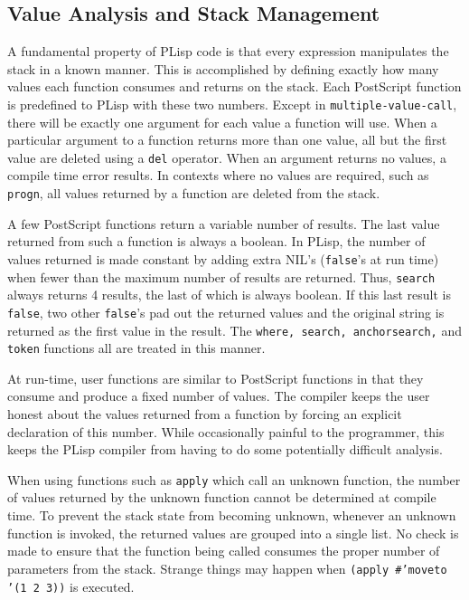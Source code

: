 \subsection {Value Analysis and Stack Management}
A fundamental property of PLisp code is that every expression
manipulates the stack in a known manner.  This is accomplished by
defining exactly how many values each function consumes and returns on
the stack.  Each PostScript function is predefined to PLisp with these
two numbers.  Except in {\tt multiple-value-call}, there will be
exactly one argument for each value a function will use.  When a
particular argument to a function returns more than one value, all but
the first value are deleted using a {\tt del} operator.  When an
argument returns no values, a compile time error results.  In contexts
where no values are required, such as {\tt progn}, all values returned
by a function are deleted from the stack.

A few PostScript functions return a variable number of results.
The last value returned from such a function is always a boolean.  In
PLisp, the number of values returned is made constant by adding extra
NIL's ({\tt false}'s at run time) when fewer than the maximum number
of results are returned.  Thus, {\tt search} always returns 4 results,
the last of which is always boolean.  If this last result is {\tt
false}, two other {\tt false}'s pad out the returned values and the
original string is returned as the first value in the result.
The {\tt where, search, anchorsearch,} and {\tt token} functions all
are treated in this manner.

At run-time, user functions are similar to PostScript functions in
that they consume and produce a fixed number of values.  The compiler
keeps the user honest about the values returned from a function by
forcing an explicit declaration of this number.  While occasionally
painful to the programmer, this keeps the PLisp compiler from having
to do some potentially difficult analysis.  

When using functions such as {\tt apply} which call an unknown
function, the number of values returned by the unknown function cannot
be determined at compile time.  To prevent the stack state from becoming
unknown, whenever an unknown function is invoked, the returned values
are grouped into a single list.  No check is made to ensure that the
function being called consumes the proper number of parameters from
the stack.  Strange things may happen when {\tt (apply \#'moveto '(1 2
3))} is executed.

